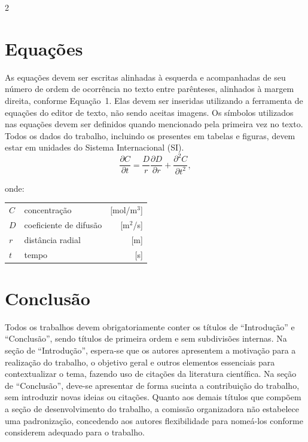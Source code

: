 \documentclass[a4paper,12pt,fleqn]{article}
\begin{document}
\begin{multicols}{2}
		\section{Equações}

		As equações devem ser escritas alinhadas à esquerda e acompanhadas de seu número de ordem de ocorrência no texto entre parênteses, alinhados à margem direita, conforme Equação 1. Elas devem ser inseridas utilizando a ferramenta de equações do editor de texto, não sendo aceitas imagens. Os símbolos utilizados nas equações devem ser definidos quando mencionado pela primeira vez no texto. Todos os dados do trabalho, incluindo os presentes em tabelas e figuras, devem estar em unidades do Sistema Internacional (SI).
		\begin{equation}
			\frac{\partial C}{\partial t} = \dfrac{D}{r}\dfrac{\partial D}{\partial r}+ \frac{\partial^2 C}{\partial t^2},
		\end{equation}


		\noindent
		onde:\\
		\begin{tabularx}{\columnwidth}{@{} l X r @{}}
			$C$ & concentração & [mol/m$^3$] \\
			$D$ & coeficiente de difusão & [m$^2$/s] \\
			$r$ & distância radial & [m] \\
			$t$ & tempo & [s] \\
		\end{tabularx}

		\section{Conclusão}
		Todos os trabalhos devem obrigatoriamente conter os títulos de “Introdução” e “Conclusão”, sendo títulos de primeira ordem e sem subdivisões internas. Na seção de “Introdução”, espera-se que os autores apresentem a motivação para a realização do trabalho, o objetivo geral e outros elementos essenciais para contextualizar o tema, fazendo uso de citações da literatura científica. Na seção de “Conclusão”, deve-se apresentar de forma sucinta a contribuição do trabalho, sem introduzir novas ideias ou citações. Quanto aos demais títulos que compõem a seção de desenvolvimento do trabalho, a comissão organizadora não estabelece uma padronização, concedendo aos autores flexibilidade para nomeá-los conforme considerem adequado para o trabalho.


\end{multicols}
\end{document}
